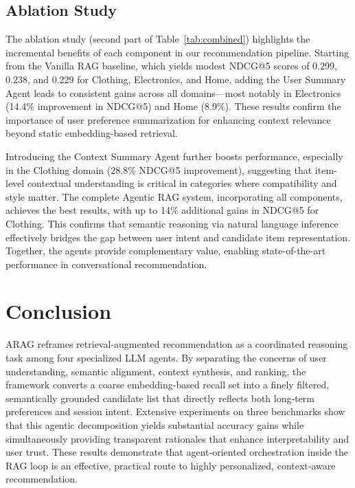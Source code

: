\documentclass[sigconf]{acmart}
\begin{document}
\subsection{Ablation Study}

The ablation study (second part of Table~\ref{tab:combined}) highlights the incremental benefits of each component in our recommendation pipeline. Starting from the Vanilla RAG baseline, which yields modest NDCG@5 scores of 0.299, 0.238, and 0.229 for Clothing, Electronics, and Home, adding the User Summary Agent leads to consistent gains across all domains—most notably in Electronics (14.4\% improvement in NDCG@5) and Home (8.9\%). These results confirm the importance of user preference summarization for enhancing context relevance beyond static embedding-based retrieval.

Introducing the Context Summary Agent further boosts performance, especially in the Clothing domain (28.8\% NDCG@5 improvement), suggesting that item-level contextual understanding is critical in categories where compatibility and style matter. The complete Agentic RAG system, incorporating all components, achieves the best results, with up to 14\% additional gains in NDCG@5 for Clothing. This confirms that semantic reasoning via natural language inference effectively bridges the gap between user intent and candidate item representation. Together, the agents provide complementary value, enabling state-of-the-art performance in conversational recommendation.

\section{Conclusion}

ARAG reframes retrieval‑augmented recommendation as a coordinated reasoning task among four specialized LLM agents. By separating the concerns of user understanding, semantic alignment, context synthesis, and ranking, the framework converts a coarse embedding‑based recall set into a finely filtered, semantically grounded candidate list that directly reflects both long‑term preferences and session intent. Extensive experiments on three benchmarks show that this agentic decomposition yields substantial accuracy gains while simultaneously providing transparent rationales that enhance interpretability and user trust. These results demonstrate that agent‑oriented orchestration inside the RAG loop is an effective, practical route to highly personalized, context‑aware recommendation.






\end{document}
